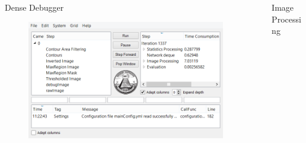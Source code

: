 \documentclass[final,hyperref={pdfpagelabels=false}]{beamer}
\begin{document}
\begin{frame}[t]
\begin{columns}[t]
\begin{column}{.465\textwidth}
\begin{block}{Dense Debugger}
\begin{figure}
\includegraphics[width=\linewidth]{PosterDebuggerCrop.png}
\caption{}
\end{figure}

\end{block}


\end{column} %

\begin{column}{.03\textwidth}\end{column} %
 
\begin{column}{.465\textwidth} %



\begin{block}{Image Processing}


\end{block}
\end{column}
\end{columns}
\end{frame}
\end{document}
